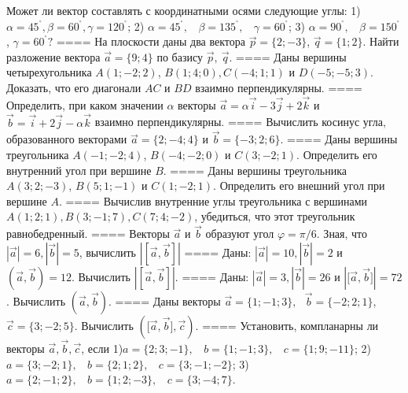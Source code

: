 Может ли вектор составлять с координатными осями следующие углы: 1) \(\alpha = 45^{{^\circ}},\beta = 60^{{^\circ}},\gamma = 120^{{^\circ}}\); 2) \(\alpha = 45^{{^\circ}},\ \ \ \ \beta = 135^{{^\circ}},\ \ \ \ \gamma = 60^{{^\circ}}\); 3) \(\alpha = 90^{{^\circ}},\ \ \ \ \beta = 150^{{^\circ}}\), \(\gamma = 60^{{^\circ}}?\)
====
На плоскости даны два вектора \(\overrightarrow{p} = \{ 2; - 3\}\), \(\overrightarrow{q} = \{ 1;2\}\). Найти разложение вектора \(\overrightarrow{a} = \{ 9;4\}\) по базису \(\overrightarrow{p},\ \overrightarrow{q}\).
====
Даны вершины четырехугольника \(A(1; - 2;2)\), \(B(1;4;0),C( - 4;1;1)\) и \(D( - 5; - 5;3)\). Доказать, что его диагонали \(AC\) и \(BD\) взаимно перпендикулярны.
====
Определить, при каком значении \(\alpha\) векторы \(\overrightarrow{a} = \alpha\overrightarrow{i} - 3\overrightarrow{j} + 2\overrightarrow{k}\) и \(\overrightarrow{b} = \overrightarrow{i} + 2\overrightarrow{j} - \alpha\overrightarrow{k}\) взаимно перпендикулярны.
====
Вычислить косинус угла, образованного векторами \(\overrightarrow{a} = \{ 2; - 4;4\}\) и \(\overrightarrow{b} = \{ - 3;2;6\}\).
====
Даны вершины треугольника \(A( - 1; - 2;4)\), \(B( - 4; - 2;0)\) и \(C(3; - 2;1)\). Определить его внутренний угол при вершине \(B\).
====
Даны вершины треугольника \(A(3;2; - 3)\), \(B(5;1; - 1)\) и \(C(1; - 2;1)\). Определить его внешний угол при вершине \(A\).
====
Вычислив внутренние углы треугольника с вершинами \(A(1;2;1),B(3; - 1;7),C(7;4; - 2)\), убедиться, что этот треугольник равнобедренный.
====
Векторы \(\overrightarrow{a}\) и \(\overrightarrow{b}\) образуют угол \(\varphi = \pi/6\). Зная, что \(|\overrightarrow{a}| = 6,|\overrightarrow{b}| = 5\), вычислить \(\left| \left\lbrack \overrightarrow{a},\overrightarrow{b} \right\rbrack \right|\)
====
Даны: \(|\overrightarrow{a}| = 10,|\overrightarrow{b}| = 2\) и \(\left( \overrightarrow{a},\overrightarrow{b} \right) = 12\). Вычислить \(\left| \left\lbrack \overrightarrow{a},\overrightarrow{b} \right\rbrack \right|\).
====
Даны: \(|\overrightarrow{a}| = 3,|\overrightarrow{b}| = 26\) и \(|\lbrack\overrightarrow{a},\overrightarrow{b}\rbrack| = 72\). Вычислить \(\left( \overrightarrow{a},\overrightarrow{b} \right)\).
====
Даны векторы \(\overrightarrow{a} = \{ 1; - 1;3\},\ \ \ \overrightarrow{b} = \{ - 2;2;1\}\), \(\overrightarrow{c} = \{ 3; - 2;5\}\). Вычислить \((\lbrack\overrightarrow{a},\overrightarrow{b}\rbrack,\overrightarrow{c})\).
====
Установить, компланарны ли векторы \(\overrightarrow{a},\overrightarrow{b},\overrightarrow{c}\), если 1)\(a = \{ 2;3; - 1\},\ \ \ \ b = \{ 1; - 1;3\},\ \ \ \ c = \{ 1;9; - 11\}\); 2)\(a = \{ 3; - 2;1\},\ \ \ \ b = \{ 2;1;2\},\ \ \ \ c = \{ 3; - 1; - 2\}\); 3)\(a = \{ 2; - 1;2\},\ \ \ \ b = \{ 1;2; - 3\},\ \ \ \ c = \{ 3; - 4;7\}\).